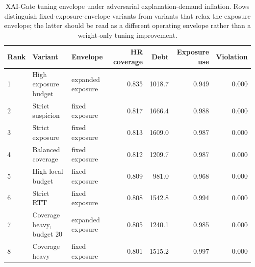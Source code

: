 \begin{table}[t]
\centering
\scriptsize
\caption{XAI-Gate tuning envelope under adversarial explanation-demand inflation. Rows distinguish fixed-exposure-envelope variants from variants that relax the exposure envelope; the latter should be read as a different operating envelope rather than a weight-only tuning improvement.}
\label{tab:xai_gate_tuning_envelope}
\begin{tabular}{lllrrrr}
\toprule
Rank & Variant & Envelope & HR coverage & Debt & Exposure use & Violation \\
\midrule
1 & High exposure budget & expanded exposure & 0.835 & 1018.7 & 0.949 & 0.000 \\
2 & Strict suspicion & fixed exposure & 0.817 & 1666.4 & 0.988 & 0.000 \\
3 & Strict exposure & fixed exposure & 0.813 & 1609.0 & 0.987 & 0.000 \\
4 & Balanced coverage & fixed exposure & 0.812 & 1209.7 & 0.987 & 0.000 \\
5 & High local budget & fixed exposure & 0.809 & 981.0 & 0.968 & 0.000 \\
6 & Strict RTT & fixed exposure & 0.808 & 1542.8 & 0.994 & 0.000 \\
7 & Coverage heavy, budget 20 & expanded exposure & 0.805 & 1240.1 & 0.985 & 0.000 \\
8 & Coverage heavy & fixed exposure & 0.801 & 1515.2 & 0.997 & 0.000 \\
\bottomrule
\end{tabular}
\end{table}
